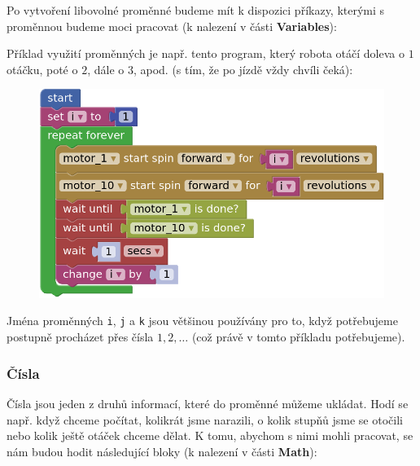 \documentclass[../main.tex]{subfiles}
\begin{document}
	Po vytvoření libovolné proměnné budeme mít k dispozici příkazy, kterými s proměnnou budeme moci pracovat (k nalezení v části \textbf{Variables}):
	\begin{itemize}
		\blockVariableChange
		\blockVariableGet
		\blockVariableSet
	\end{itemize}

	 Příklad využití proměnných je např. tento program, který robota otáčí doleva o $1$ otáčku, poté o $2$, dále o $3$, apod. (s tím, že po jízdě vždy chvíli čeká):

	\begin{figure}[h!]%
		\centering
		\begin{minipage}{0.5\textwidth}
			\includegraphics[width=\linewidth]{Images/05/variable-program.png}
		\end{minipage}
	\end{figure}

	Jména proměnných \texttt{i}, \texttt{j} a \texttt{k} jsou většinou používány pro to, když potřebujeme postupně procházet přes čísla $1, 2, \ldots$ (což právě v tomto příkladu potřebujeme).

	\subsubsection{Čísla}\label{cha:math}
	Čísla jsou jeden z druhů informací, které do proměnné můžeme ukládat. Hodí se např. když chceme počítat, kolikrát jsme narazili, o kolik stupňů jsme se otočili nebo kolik ještě otáček chceme dělat. K tomu, abychom s nimi mohli pracovat, se nám budou hodit následující bloky (k nalezení v části \textbf{Math}):
  
	\begin{itemize}
		\blockMathOperation
		\blockMathTest
		\blockMathValue
		\blockMathConstant
		\blockMathRandom
	\end{itemize}
\end{document}
